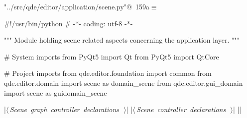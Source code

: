 \documentclass[%
    a4paper,    %
    justified,  %
    nobib,      %
    openany     %
]{tufte-book}
\begin{document}
\begin{flushleft} \small
\begin{minipage}{\linewidth}\label{scrap173}\raggedright\small
{} \verb@"../src/qde/editor/application/scene.py"@\nobreak\ {\footnotesize {159a}}$\equiv$
\vspace{-1ex}
\begin{pythoncode}
#!/usr/bin/python
# -*- coding: utf-8 -*-

""" Module holding scene related aspects concerning the application layer.
"""

# System imports
from PyQt5 import Qt
from PyQt5 import QtCore

# Project imports
from qde.editor.foundation import common
from qde.editor.domain     import scene as domain_scene
from qde.editor.gui_domain import scene as guidomain_scene

|\hbox{$\langle\,${\itshape Scene graph controller declarations}\nobreak\ {\footnotesize {}}$\,\rangle$}|
|\hbox{$\langle\,${\itshape Scene controller declarations}\nobreak\ {\footnotesize {}}$\,\rangle$}|
|\NWsep|
\end{pythoncode}
\vspace{1.5ex}
\footnotesize
\begin{list}{}{\setlength{\itemsep}{-\parsep}\setlength{\itemindent}{-\leftmargin}}

\item{}
\end{list}
\end{minipage}\vspace{4ex}
\end{flushleft}
\end{document}
